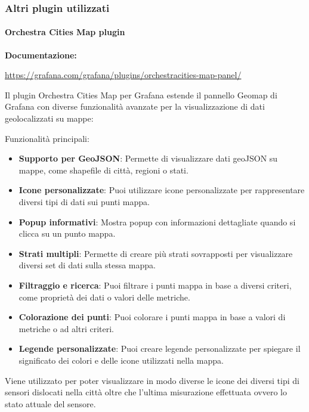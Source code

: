 \subsubsection{Altri plugin utilizzati}
\paragraph{Orchestra Cities Map plugin}
\textbf{Documentazione:}

\href{https://grafana.com/grafana/plugins/orchestracities-map-panel/}{https://grafana.com/grafana/plugins/orchestracities-map-panel/}

Il plugin Orchestra Cities Map per Grafana estende il pannello Geomap di Grafana con diverse funzionalità avanzate per la visualizzazione di dati geolocalizzati su mappe:

Funzionalità principali:
\begin{itemize}
    \item \textbf{Supporto per GeoJSON}: Permette di visualizzare dati geoJSON su mappe, come shapefile di città, regioni o stati.
    \item \textbf{Icone personalizzate}: Puoi utilizzare icone personalizzate per rappresentare diversi tipi di dati sui punti mappa.
    \item \textbf{Popup informativi}: Mostra popup con informazioni dettagliate quando si clicca su un punto mappa.
    \item \textbf{Strati multipli}: Permette di creare più strati sovrapposti per visualizzare diversi set di dati sulla stessa mappa.
    \item \textbf{Filtraggio e ricerca}: Puoi filtrare i punti mappa in base a diversi criteri, come proprietà dei dati o valori delle metriche.
    \item \textbf{Colorazione dei punti}: Puoi colorare i punti mappa in base a valori di metriche o ad altri criteri.
    \item \textbf{Legende personalizzate}: Puoi creare legende personalizzate per spiegare il significato dei colori e delle icone utilizzati nella mappa.
\end{itemize}

Viene utilizzato per poter visualizzare in modo diverse le icone dei diversi tipi di sensori dislocati nella città oltre che l'ultima misurazione effettuata ovvero lo stato attuale del sensore.